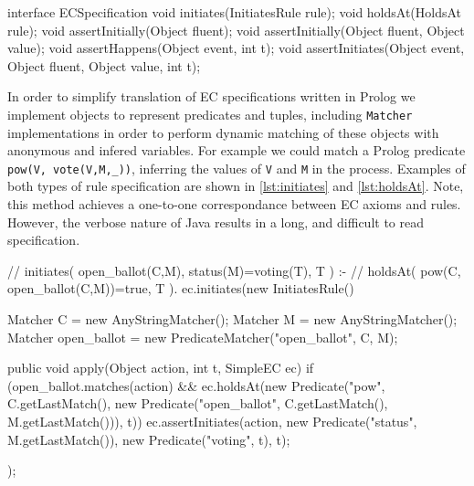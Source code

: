 \begin{java}[label=lst:iecspec,caption=Java interface for declaration of an EC specification]
interface ECSpecification {
	void initiates(InitiatesRule rule);
	void holdsAt(HoldsAt rule);
	void assertInitially(Object fluent);
	void assertInitially(Object fluent, Object value);
	void assertHappens(Object event, int t);
	void assertInitiates(Object event, Object fluent, Object value, int t);
}
\end{java}

In order to simplify translation of \ac{EC} specifications written in Prolog
we implement objects to represent predicates and tuples, including
\texttt{Matcher} implementations in order to perform dynamic matching of these
objects with anonymous and infered variables. For example we could match a
Prolog predicate \texttt{pow(V, vote(V,M,\_))}, inferring the values of
\texttt{V} and \texttt{M} in the process. Examples of both types of rule
specification are shown in \autoref{lst:initiates} and \autoref{lst:holdsAt}.
Note, this method achieves a one-to-one correspondance between \ac{EC} axioms
and rules. However, the verbose nature of Java results in a long, and
difficult to read specification.

\begin{java}[label=lst:initiates, caption={[Example of initiates rule]Example of initiates rule. Matchers are used to built a description of the event we wish to match. The matched arguments in this event are then used in the \emph{holdsAt} query to check whether the actor is empowered to perform the action. If the event and query are both valid we assert the change to the \emph{status} predicate.}]
// initiates( open_ballot(C,M), status(M)=voting(T), T ) :-
//     holdsAt( pow(C, open_ballot(C,M))=true, T ).
ec.initiates(new InitiatesRule() {
	Matcher C = new AnyStringMatcher();
	Matcher M = new AnyStringMatcher();
	Matcher open_ballot = new PredicateMatcher("open_ballot", C, M);

	public void apply(Object action, int t, SimpleEC ec) {
		if (open_ballot.matches(action)
				&& ec.holdsAt(new Predicate("pow", C.getLastMatch(),
						new Predicate("open_ballot", C.getLastMatch(),
								M.getLastMatch())), t)) {
			ec.assertInitiates(action,
					new Predicate("status", M.getLastMatch()),
					new Predicate("voting", t), t);
		}
	}
});
\end{java}

